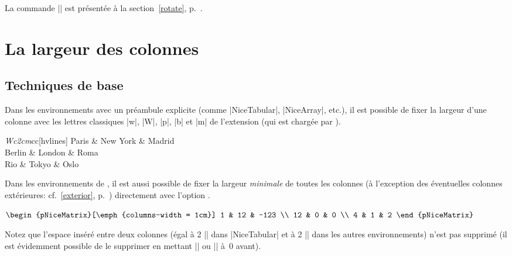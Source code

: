 \documentclass[dvipsnames]{article}
\begin{document}
\medskip
La commande |\rotate| est présentée à la section~\ref{rotate}, p.~\pageref{rotate}.




\section{La largeur des colonnes}
\label{width}

\subsection{Techniques de base}

Dans les environnements avec un préambule explicite (comme |{NiceTabular}|,
|{NiceArray}|, etc.), il est possible de fixer la largeur d'une colonne avec les
lettres classiques |w|, |W|, |p|, |b| et |m| de l'extension  (qui est
chargée par ).

\medskip
\begin{Code}[width=9cm,show-output,no-cell-nodes]
\begin{NiceTabular}{\emph{W{c}{2cm}}cc}[hvlines]
  Paris  & New York & Madrid \\
  Berlin & London   & Roma    \\
  Rio    & Tokyo    & Oslo
\end{NiceTabular}
\end{Code}


\medbreak
{}
Dans les environnements de , il est aussi possible de fixer la
largeur \emph{minimale} de toutes les colonnes (à l'exception des éventuelles
colonnes extérieures: cf.~\ref{exterior}, p.~\pageref{exterior}) directement
avec l'option .

\medskip
\begin{Code}[width=10cm,show-output,no-cell-nodes]
$\begin{pNiceMatrix}[\emph{columns-width = 1cm}]
  1  & 12 & -123 \\
  12 & 0  & 0    \\
  4  & 1  & 2
\end{pNiceMatrix}$
\end{Code}

\medskip
Notez que l'espace inséré entre deux colonnes (égal à 2 |\tabcolsep| dans
|{NiceTabular}| et à 2 |\arraycolsep| dans les autres environnements) n'est pas
supprimé (il est évidemment possible de le supprimer en mettant |\tabcolsep| ou
|\arraycolsep| à~$0$ avant).
\end{document}
